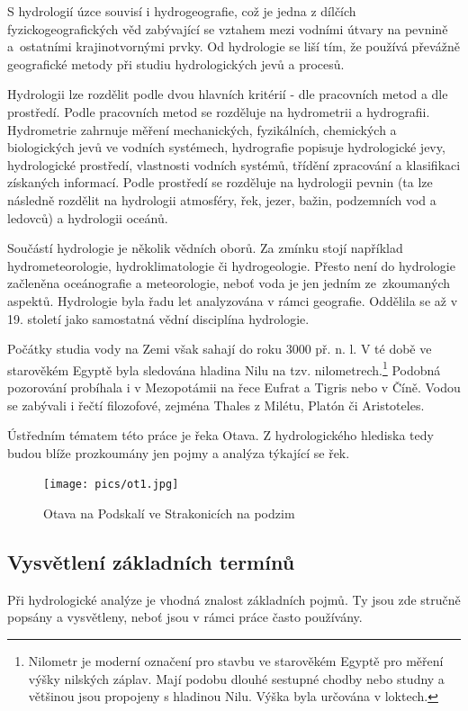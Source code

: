 \documentclass[thesis=M,czech]{FITthesis}[2012/06/26]
\begin{document}
S hydrologií úzce souvisí i hydrogeografie, což je jedna z dílčích fyzickogeografických věd zabývající se vztahem mezi vodními útvary na pevnině a~ostatními krajinotvornými prvky. Od hydrologie se liší tím, že používá převážně geografické metody při studiu hydrologických jevů a procesů. 


Hydrologii lze rozdělit podle dvou hlavních kritérií - dle pracovních metod a dle prostředí. Podle pracovních metod se rozděluje na hydrometrii a hydrografii. Hydrometrie zahrnuje měření mechanických, fyzikálních, chemických a biologických jevů ve vodních systémech, hydrografie popisuje hydrologické jevy, hydrologické prostředí, vlastnosti vodních systémů, třídění zpracování a klasifikaci získaných informací. Podle prostředí se rozděluje na hydrologii pevnin (ta lze následně rozdělit na hydrologii atmosféry, řek, jezer, bažin, podzemních vod a ledovců) a hydrologii oceánů. 

Součástí hydrologie je několik vědních oborů. Za zmínku stojí například hydrometeorologie, hydroklimatologie či hydrogeologie. Přesto není do hydrologie začleněna oceánografie a meteorologie, neboť voda je jen jedním ze~zkoumaných aspektů. Hydrologie byla řadu let analyzována v rámci geografie. Oddělila se až v 19. století jako samostatná vědní disciplína hydrologie. 

Počátky studia vody na Zemi však sahají do roku 3000 př. n. l. V té době ve starověkém Egyptě byla sledována hladina Nilu na tzv. nilometrech.\footnote{Nilometr je moderní označení pro stavbu ve starověkém Egyptě pro měření výšky nilských záplav. Mají podobu dlouhé sestupné chodby nebo studny a většinou jsou propojeny s hladinou Nilu. Výška byla určována v loktech.} Podobná pozorování probíhala i v Mezopotámii na řece Eufrat a Tigris nebo v Číně. Vodou se zabývali i řečtí filozofové, zejména Thales z Milétu, Platón či Aristoteles. 


Ústředním tématem této práce je řeka Otava. Z hydrologického hlediska tedy budou blíže prozkoumány jen pojmy a analýza týkající se řek. \cite{definiceHydro} \cite{FGkniha} \cite{hydro_net}


\begin{figure}[h!]
	\centering
	\texttt{[image: pics/ot1.jpg]}
	\caption{Otava na Podskalí ve Strakonicích na podzim}
	\label{obrazek:ot1}
\end{figure}


\subsection{Vysvětlení základních termínů}
Při hydrologické analýze je vhodná znalost základních pojmů. Ty jsou zde stručně popsány a vysvětleny, neboť jsou v rámci práce často používány. \cite{terminy}
\end{document}
